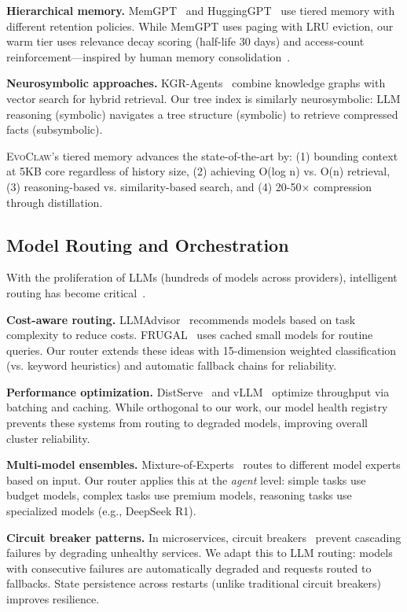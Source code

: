 \documentclass{article}
\newcommand{\evoclaw}{\textsc{EvoClaw}}
\begin{document}
\textbf{Hierarchical memory.} MemGPT~\cite{packer2023memgpt} and HuggingGPT~\cite{shen2023hugginggpt} use tiered memory with different retention policies. While MemGPT uses paging with LRU eviction, our warm tier uses relevance decay scoring (half-life 30 days) and access-count reinforcement---inspired by human memory consolidation~\cite{atkinson1971human}.

\textbf{Neurosymbolic approaches.} KGR-Agents~\cite{wang2024kgr} combine knowledge graphs with vector search for hybrid retrieval. Our tree index is similarly neurosymbolic: LLM reasoning (symbolic) navigates a tree structure (symbolic) to retrieve compressed facts (subsymbolic).

\evoclaw{}'s tiered memory advances the state-of-the-art by: (1) bounding context at 5KB core regardless of history size, (2) achieving O(log n) vs. O(n) retrieval, (3) reasoning-based vs. similarity-based search, and (4) 20-50$\times$ compression through distillation.

\subsection{Model Routing and Orchestration}

With the proliferation of LLMs (hundreds of models across providers), intelligent routing has become critical~\cite{zheng2023survey}.

\textbf{Cost-aware routing.} LLMAdvisor~\cite{liu2023llm} recommends models based on task complexity to reduce costs. FRUGAL~\cite{lyu2023frugal} uses cached small models for routine queries. Our router extends these ideas with 15-dimension weighted classification (vs. keyword heuristics) and automatic fallback chains for reliability.

\textbf{Performance optimization.} DistServe~\cite{zheng2023distserve} and vLLM~\cite{kwon2023efficient} optimize throughput via batching and caching. While orthogonal to our work, our model health registry prevents these systems from routing to degraded models, improving overall cluster reliability.

\textbf{Multi-model ensembles.} Mixture-of-Experts~\cite{shazeer2017outrageously} routes to different model experts based on input. Our router applies this at the \textit{agent} level: simple tasks use budget models, complex tasks use premium models, reasoning tasks use specialized models (e.g., DeepSeek R1).

\textbf{Circuit breaker patterns.} In microservices, circuit breakers~\cite{ford2000circuit} prevent cascading failures by degrading unhealthy services. We adapt this to LLM routing: models with consecutive failures are automatically degraded and requests routed to fallbacks. State persistence across restarts (unlike traditional circuit breakers) improves resilience.
\end{document}
